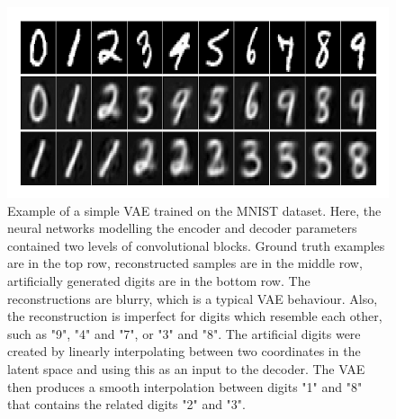 \begin{figure}
\centering{}\includegraphics[scale=0.8]{data/chapter_survey/mnist_reconstruction_generation}\caption{Example of a simple VAE trained on the MNIST dataset. Here, the neural networks modelling the encoder and decoder parameters contained two levels of convolutional blocks. Ground truth examples are in the top row, reconstructed samples are in the middle row, artificially generated digits are in the bottom row. The reconstructions are blurry, which is a typical VAE behaviour. Also, the reconstruction is imperfect for digits which resemble each other, such as "9", "4" and "7", or "3" and "8". The artificial digits were created by linearly interpolating between two coordinates in the latent space and using this as an input to the decoder. The VAE then produces a smooth interpolation between digits "1" and "8" that contains the related digits "2" and "3".}
\label{fig:mnist_reconstruction}
\end{figure}
 
